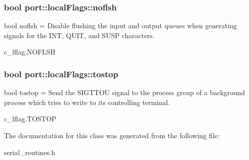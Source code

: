 \subsubsection[{\texorpdfstring{noflsh}{noflsh}}]{\setlength{\rightskip}{0pt plus 5cm}bool port\+::local\+Flags\+::noflsh}\hypertarget{classport_1_1localFlags_a889a392c648e398126db96326ac44114}{}\label{classport_1_1localFlags_a889a392c648e398126db96326ac44114}


bool noflsh = Disable flushing the input and output queues when generating signals for the I\+NT, Q\+U\+IT, and S\+U\+SP characters. 

c\+\_\+lflag.\+N\+O\+F\+L\+SH
\subsubsection[{\texorpdfstring{tostop}{tostop}}]{\setlength{\rightskip}{0pt plus 5cm}bool port\+::local\+Flags\+::tostop}\hypertarget{classport_1_1localFlags_a12ac0107b1732e3299333926fdc4829e}{}\label{classport_1_1localFlags_a12ac0107b1732e3299333926fdc4829e}


bool tostop = Send the S\+I\+G\+T\+T\+OU signal to the process group of a background process which tries to write to its controlling terminal. 

c\+\_\+lflag.\+T\+O\+S\+T\+OP

The documentation for this class was generated from the following file\+:\begin{DoxyCompactItemize}
\item 
serial\+\_\+routines.\+h\end{DoxyCompactItemize}
